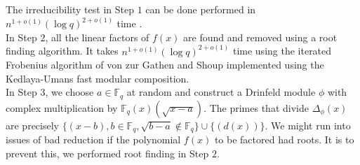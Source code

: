 \documentclass{article}
\theoremstyle{plain}
\theoremstyle{definition}
\def\F{\ensuremath{\mathbb{F}}}
\newcommand{\D}{\Delta}
\begin{document}
The irreducibility test in Step $1$ can be done performed in $n^{1+o(1)} (\log q)^{2+o(1)}$ time \cite{ku}.\\ 

\noindent In Step $2$, all the linear factors of $f(x)$ are found and removed using a root finding algorithm. It takes $n^{1+o(1)} (\log q)^{2+o(1)}$ time using the iterated Frobenius algorithm of von zur Gathen and Shoup \cite{gs} implemented using the Kedlaya-Umans \cite{ku} fast modular composition. \\

\noindent In Step $3$, we choose $a \in \F_q$ at random and construct a Drinfeld module $\phi$ with complex multiplication by $\F_q(x)(\sqrt{x-a})$. The primes that divide $\D_\phi(x)$ are precisely $\{(x-b),  b \in \F_q, \sqrt{b-a} \notin \F_q\} \cup \{(d(x))\}$. We might run into issues of bad reduction if the polynomial $f(x)$ to be factored had roots. It is to prevent this, we performed root finding in Step $2$. \\
\end{document}
